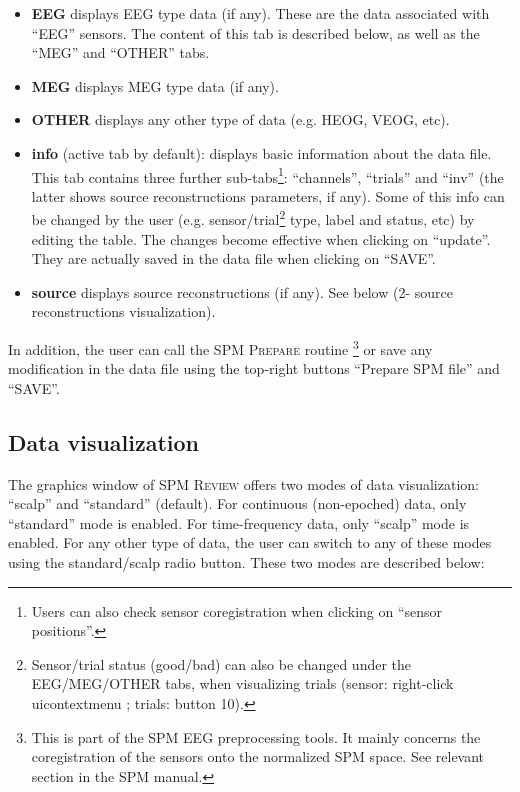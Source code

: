 \begin{itemize}

\item{\textbf{EEG}} displays EEG type data (if any). These are the data associated with ``EEG'' sensors. The content of this tab is described below, as well as the ``MEG'' and ``OTHER'' tabs.

\item{\textbf{MEG}} displays MEG type data (if any).

\item{\textbf{OTHER}} displays any other type of data (e.g. HEOG, VEOG, etc).

\item{\textbf{info}}
(active tab by default): displays basic information about the data file. This tab contains three further sub-tabs\footnote{Users can also check sensor coregistration when clicking on ``sensor positions''.}: ``channels'', ``trials'' and ``inv'' (the latter shows source reconstructions parameters, if any). Some of this info can be changed by the user (e.g. sensor/trial\footnote{Sensor/trial status (good/bad) can also be changed under the EEG/MEG/OTHER tabs, when visualizing trials (sensor: right-click uicontextmenu ; trials: button 10).}  type, label and status, etc) by editing the table. The changes become effective when clicking on ``update''. They are actually saved in the data file when clicking on ``SAVE''.

\item{\textbf{source}}
displays source reconstructions (if any). See below (2- source reconstructions visualization).

\end{itemize}

In addition, the user can call the SPM \textsc{Prepare} routine \footnote{This is part of the SPM EEG preprocessing tools. It mainly concerns the coregistration of the sensors onto the normalized SPM space. See relevant section in the SPM manual.} or save any modification in the data file using the top-right buttons ``Prepare SPM file'' and ``SAVE''.


\subsection{Data visualization}
The graphics window of SPM \textsc{Review} offers two modes of data visualization: ``scalp'' and ``standard'' (default). For continuous (non-epoched) data, only ``standard'' mode is enabled. For time-frequency data, only ``scalp'' mode is enabled. For any other type of data, the user can switch to any of these modes using the standard/scalp radio button.
These two modes are described below:

